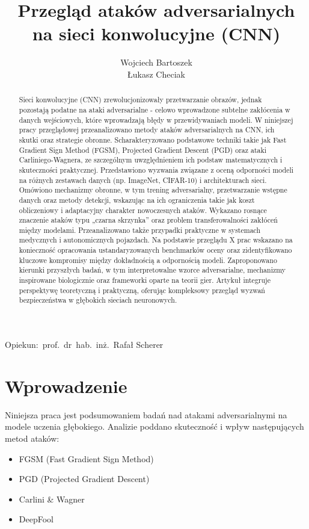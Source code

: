 \documentclass[12pt]{article}
\title{Przegląd ataków adversarialnych na sieci konwolucyjne (CNN)}
\author{
    Wojciech Bartoszek \\
    Łukasz Checiak
}
\date{}
\begin{document}
\maketitle

\begin{center}
    Opiekun:\ prof.\ dr\ hab.\ inż.\ Rafał Scherer
\end{center}

\begin{abstract}
    Sieci konwolucyjne (CNN) zrewolucjonizowały przetwarzanie obrazów, jednak pozostają podatne na ataki adversarialne - celowo wprowadzone subtelne zakłócenia w danych wejściowych, które wprowadzają błędy w przewidywaniach modeli. W niniejszej pracy przeglądowej przeanalizowano metody ataków adversarialnych na CNN, ich skutki oraz strategie obronne. Scharakteryzowano podstawowe techniki takie jak Fast Gradient Sign Method (FGSM), Projected Gradient Descent (PGD) oraz ataki Carliniego-Wagnera, ze szczególnym uwzględnieniem ich podstaw matematycznych i skuteczności praktycznej. Przedstawiono wyzwania związane z oceną odporności modeli na różnych zestawach danych (np. ImageNet, CIFAR-10) i architekturach sieci. Omówiono mechanizmy obronne, w tym trening adversarialny, przetwarzanie wstępne danych oraz metody detekcji, wskazując na ich ograniczenia takie jak koszt obliczeniowy i adaptacyjny charakter nowoczesnych ataków. Wykazano rosnące znaczenie ataków typu „czarna skrzynka” oraz problem transferowalności zakłóceń między modelami. Przeanalizowano także przypadki praktyczne w systemach medycznych i autonomicznych pojazdach. Na podstawie przeglądu X prac wskazano na konieczność opracowania ustandaryzowanych benchmarków oceny oraz zidentyfikowano kluczowe kompromisy między dokładnością a odpornością modeli. Zaproponowano kierunki przyszłych badań, w tym interpretowalne wzorce adversarialne, mechanizmy inspirowane biologicznie oraz frameworki oparte na teorii gier. Artykuł integruje perspektywę teoretyczną i praktyczną, oferując kompleksowy przegląd wyzwań bezpieczeństwa w głębokich sieciach neuronowych.
\end{abstract}


\section{Wprowadzenie}
Niniejsza praca jest podsumowaniem badań nad atakami adversarialnymi na modele uczenia głębokiego. Analizie poddano skuteczność i wpływ następujących metod ataków:
\begin{itemize}
    \item FGSM (Fast Gradient Sign Method)
    \item PGD (Projected Gradient Descent)
    \item Carlini \& Wagner
    \item DeepFool
\end{itemize}
\end{document}
